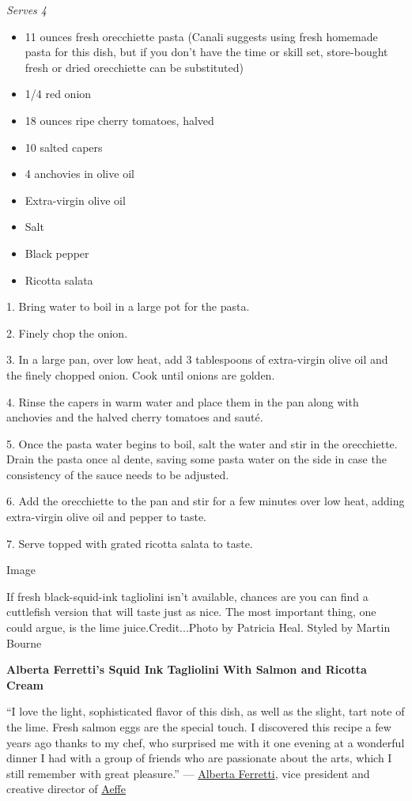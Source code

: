 \emph{Serves 4}

\begin{itemize}
\item
  11 ounces fresh orecchiette pasta (Canali suggests using fresh
  homemade pasta for this dish, but if you don't have the time or skill
  set, store-bought fresh or dried orecchiette can be substituted)
\item
  1/4 red onion
\item
  18 ounces ripe cherry tomatoes, halved
\item
  10 salted capers
\item
  4 anchovies in olive oil
\item
  Extra-virgin olive oil
\item
  Salt
\item
  Black pepper
\item
  Ricotta salata
\end{itemize}

1. Bring water to boil in a large pot for the pasta.

2. Finely chop the onion.

3. In a large pan, over low heat, add 3 tablespoons of extra-virgin
olive oil and the finely chopped onion. Cook until onions are golden.

4. Rinse the capers in warm water and place them in the pan along with
anchovies and the halved cherry tomatoes and sauté.

5. Once the pasta water begins to boil, salt the water and stir in the
orecchiette. Drain the pasta once al dente, saving some pasta water on
the side in case the consistency of the sauce needs to be adjusted.

6. Add the orecchiette to the pan and stir for a few minutes over low
heat, adding extra-virgin olive oil and pepper to taste.

7. Serve topped with grated ricotta salata to taste.

Image

If fresh black-squid-ink tagliolini isn't available, chances are you can
find a cuttlefish version that will taste just as nice. The most
important thing, one could argue, is the lime juice.Credit...Photo by
Patricia Heal. Styled by Martin Bourne

\textbf{Alberta Ferretti's Squid Ink Tagliolini With Salmon and Ricotta
Cream}

``I love the light, sophisticated flavor of this dish, as well as the
slight, tart note of the lime. Fresh salmon eggs are the special touch.
I discovered this recipe a few years ago thanks to my chef, who
surprised me with it one evening at a wonderful dinner I had with a
group of friends who are passionate about the arts, which I still
remember with great pleasure.'' ---
\href{https://www.nytimes3xbfgragh.onion/slideshow/2019/09/18/fashion/runway-womens/alberta-ferretti-spring-2020/s/AFerretti-spring-2020-rtw-slide-IYOM.html}{Alberta
Ferretti}, vice president and creative director of
\href{https://aeffe.com/}{Aeffe}

